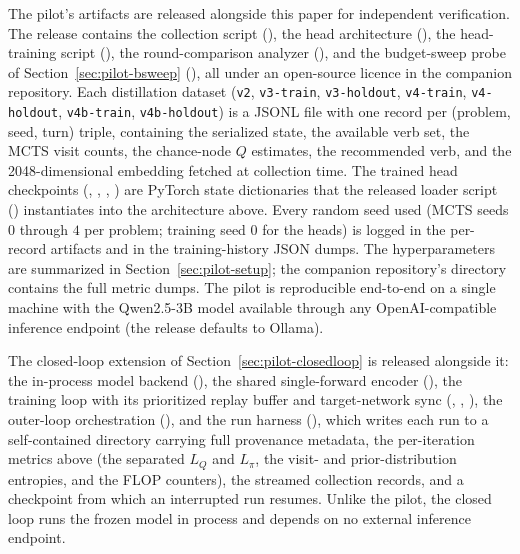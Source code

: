 The pilot's artifacts are released alongside this paper for independent
verification. The release contains the collection script
(), the head architecture
(), the head-training script
(), the round-comparison
analyzer (), and
the budget-sweep probe of Section~\ref{sec:pilot-bsweep}
(), all
under an open-source licence in the companion repository. Each
distillation dataset (\texttt{v2}, \texttt{v3-train}, \texttt{v3-holdout},
\texttt{v4-train}, \texttt{v4-holdout}, \texttt{v4b-train},
\texttt{v4b-holdout}) is a JSONL file with one record
per (problem, seed, turn) triple, containing the serialized state, the
available verb set, the MCTS visit counts, the chance-node $Q$
estimates, the recommended verb, and the 2048-dimensional embedding
fetched at collection time. The trained head checkpoints
(, , ,
)
are PyTorch state dictionaries that the released loader script
() instantiates
into the architecture above. Every random seed used (MCTS seeds $0$
through $4$ per problem; training seed $0$ for the heads) is logged in
the per-record artifacts and in the training-history JSON dumps. The
hyperparameters are summarized in Section~\ref{sec:pilot-setup}; the
companion repository's  directory contains
the full metric dumps. The pilot is reproducible end-to-end on a single
machine with the Qwen2.5-3B model available through any
OpenAI-compatible inference endpoint (the release defaults to Ollama).

The closed-loop extension of Section~\ref{sec:pilot-closedloop} is released
alongside it: the in-process model backend
(), the shared
single-forward encoder (), the training loop with
its prioritized replay buffer and target-network sync (,
, ), the outer-loop orchestration
(), and the run harness
(), which writes each run to a
self-contained directory carrying full provenance metadata, the per-iteration
metrics above (the separated $L_Q$ and $L_{\pi}$, the visit- and
prior-distribution entropies, and the FLOP counters), the streamed collection
records, and a checkpoint from which an interrupted run resumes. Unlike the
pilot, the closed loop runs the frozen model in process and depends on no
external inference endpoint.

